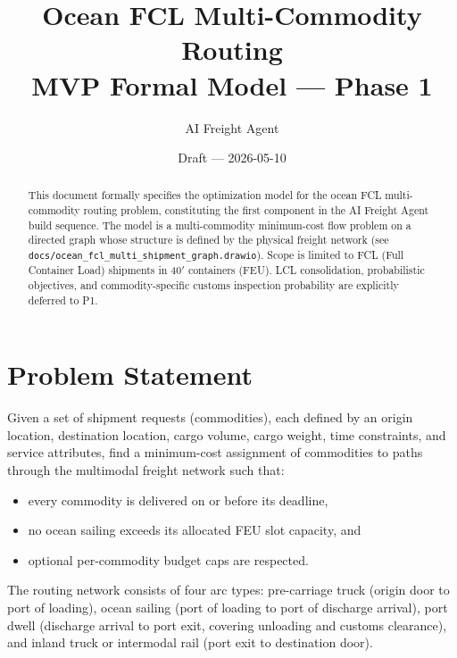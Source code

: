 \documentclass[11pt,a4paper]{article}
\title{\textbf{Ocean FCL Multi-Commodity Routing}\\[0.5em]
\large MVP Formal Model --- Phase 1}
\author{AI Freight Agent}
\date{Draft --- 2026-05-10}
\theoremstyle{definition}
\begin{document}
\maketitle

\begin{abstract}
This document formally specifies the optimization model for the ocean FCL multi-commodity
routing problem, constituting the first component in the AI Freight Agent build sequence.
The model is a multi-commodity minimum-cost flow problem on a directed graph whose
structure is defined by the physical freight network (see \texttt{docs/ocean\_fcl\_multi\_shipment\_graph.drawio}).
Scope is limited to FCL (Full Container Load) shipments in 40$'$ containers (FEU).
LCL consolidation, probabilistic objectives, and commodity-specific customs inspection
probability are explicitly deferred to P1.
\end{abstract}

\tableofcontents
\newpage

\section{Problem Statement}

Given a set of shipment requests (commodities), each defined by an origin location,
destination location, cargo volume, cargo weight, time constraints, and service
attributes, find a minimum-cost assignment of commodities to paths through the
multimodal freight network such that:
\begin{itemize}[noitemsep]
  \item every commodity is delivered on or before its deadline,
  \item no ocean sailing exceeds its allocated FEU slot capacity, and
  \item optional per-commodity budget caps are respected.
\end{itemize}

The routing network consists of four arc types: pre-carriage truck (origin door to
port of loading), ocean sailing (port of loading to port of discharge arrival), port
dwell (discharge arrival to port exit, covering unloading and customs clearance), and
inland truck or intermodal rail (port exit to destination door).
\end{document}
